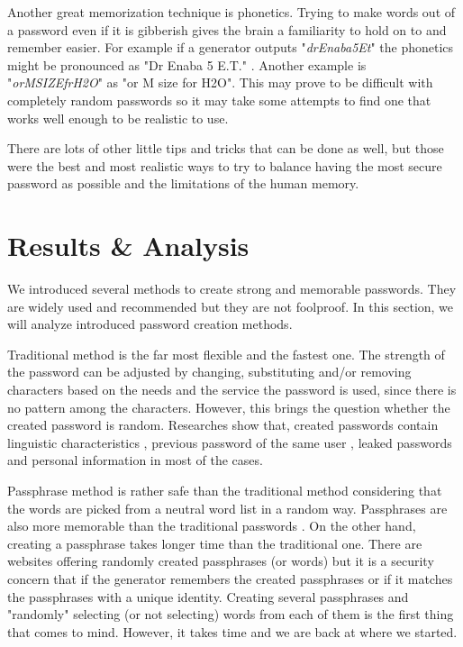 \documentclass[acmsmall,nonacm]{acmart}
\begin{document}
Another great memorization technique is phonetics. Trying to make words out of a password even if it is gibberish gives the brain a familiarity to hold on to and remember easier. For example if a generator outputs "\emph{drEnaba5Et}" the phonetics might be pronounced as "Dr Enaba 5 E.T." \cite{rubenking_2021}. Another example is "\emph{orMSIZEfrH2O}" as "or M size for H2O". This may prove to be difficult with completely random passwords so it may take some attempts to find one that works well enough to be realistic to use.

There are lots of other little tips and tricks that can be done as well, but those were the best and most realistic ways to try to balance having the most secure password as possible and the limitations of the human memory.

\section{Results \& Analysis} \label{results}

We introduced several methods to create strong and memorable passwords. They are widely used and recommended but they are not foolproof. In this section, we will analyze introduced password creation methods.

Traditional method is the far most flexible and the fastest one. The strength of the password can be adjusted by changing, substituting and/or removing characters based on the needs and the service the password is used, since there is no pattern among the characters. However, this brings the question whether the created password is random. Researches show that, created passwords contain linguistic characteristics \cite{curran_2011}, previous password of the same user \cite{bhagavatula_2020,10.5555/3235895.3235911,das_2014}, leaked passwords \cite{das_2014} and personal information \cite{siau_2018,tulek_2020} in most of the cases.

Passphrase method is rather safe than the traditional method considering that the words are picked from a neutral word list in a random way. Passphrases are also more memorable than the traditional passwords \cite{fernandes_2021}. On the other hand, creating a passphrase takes longer time than the traditional one. There are websites offering randomly created passphrases (or words) but it is a security concern that if the generator remembers the created passphrases or if it matches the passphrases with a unique identity. Creating several passphrases and "randomly" selecting (or not selecting) words from each of them is the first thing that comes to mind. However, it takes time and we are back at where we started.
\end{document}
